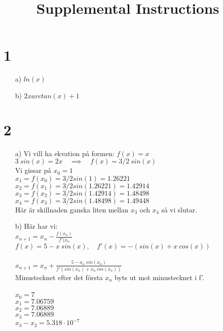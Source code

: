 \documentclass{article}
\title{Supplemental Instructions}
\date{
     }
\begin{document}
\maketitle

\section*{1}
\begin{itemize}
    \item[a) ] $ln(x)$
    \item[b) ] $2x arctan(x) +1$
\end{itemize}

\section*{2}
\begin{itemize}
\item[a) ] 
Vi vill ha ekvation på formen: $f(x) = x$ \\
$3 \> sin(x) = 2x \quad \implies \quad f(x) = 3/2 \> sin(x)$ \\
Vi gissar på $x_0 = 1$ \\
$x_1 = f(x_0) = 3/2 sin(1) = 1.26221$ \\
$x_2 = f(x_1) = 3/2 sin(1.26221) = 1.42914$ \\ 
$x_3 = f(x_2) = 3/2 sin(1.42914) = 1.48498$ \\
$x_4 = f(x_3) = 3/2 sin(1.48498) = 1.49448$ \\
Här är skillnaden ganska liten mellan $x_3$ och $x_4$ så vi slutar.


\item[b) ] Här har vi: \\
$x_{n+1} = x_n - \frac{f(x_n)}{f'(x_n}$ \\
$f(x) = 5 - x \> sin(x), \quad f'(x) = -(sin(x) + x \> cos(x))$ \\ \\
$x_{n+1} = x_n + \frac{5 - x_n \> sin(x_n)}{f'(sin(x_n) + x_n \> cos(x_n))}$ \\
Minustecknet efter det första $x_n$ byts ut mot minustecknet i f'.
\\\\
$x_0 = 7$ \\
$x_1 = 7.06759$\\
$x_2 = 7.06889$ \\
$x_3 = 7.06889$ \\
$x_3 - x_2 = 5.318 \cdot 10^{-7}$
\end{itemize}
\end{document}
